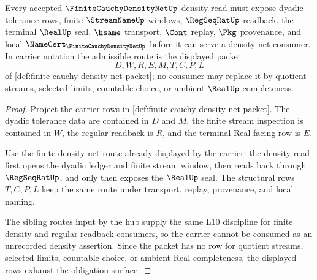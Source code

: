 \begin{theorem}
\label{thm:finite-cauchy-density-net-obligation-carrier}
Every accepted $\FiniteCauchyDensityNetUp$ density read must expose dyadic tolerance rows, finite $\StreamNameUp$ windows, $\RegSeqRatUp$ readback, the terminal $\RealUp$ seal, $\hsame$ transport, $\Cont$ replay, $\Pkg$ provenance, and local $\NameCert_{\FiniteCauchyDensityNetUp}$ before it can serve a density-net consumer. In carrier notation the admissible route is the displayed packet
$$
D,W,R,E,M,T,C,P,L
$$
of \autoref{def:finite-cauchy-density-net-packet}; no consumer may replace it by quotient streams, selected limits, countable choice, or ambient $\RealUp$ completeness.
\end{theorem}
\begin{proof}
Project the carrier rows in \autoref{def:finite-cauchy-density-net-packet}. The dyadic tolerance data are contained in $D$ and $M$, the finite stream inspection is contained in $W$, the regular readback is $R$, and the terminal Real-facing row is $E$.

Use the finite density-net route already displayed by the carrier: the density read first opens the dyadic ledger and finite stream window, then reads back through $\RegSeqRatUp$, and only then exposes the $\RealUp$ seal. The structural rows $T,C,P,L$ keep the same route under transport, replay, provenance, and local naming.

The sibling routes input by the hub supply the same L10 discipline for finite density and regular readback consumers, so the carrier cannot be consumed as an unrecorded density assertion. Since the packet has no row for quotient streams, selected limits, countable choice, or ambient Real completeness, the displayed rows exhaust the obligation surface.
\end{proof}

